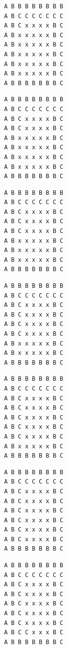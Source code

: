 { \begin{verbatim}
         A B B B B B B B B
         A B C C C C C C C
         A B C x x x x B C
         A B x x x x x B C
         A B x x x x x B C
         A B x x x x x B C
         A B x x x x x B C
         A B x x x x x B C
         A B B B B B B B C
\end{verbatim} }

{ \begin{verbatim}
         A B B B B B B B B
         A B C C C C C C C
         A B C x x x x B C
         A B C x x x x B C
         A B x x x x x B C
         A B x x x x x B C
         A B x x x x x B C
         A B x x x x x B C
         A B B B B B B B C
\end{verbatim} }

{ \begin{verbatim}
         A B B B B B B B B
         A B C C C C C C C
         A B C x x x x B C
         A B C x x x x B C
         A B C x x x x B C
         A B x x x x x B C
         A B x x x x x B C
         A B x x x x x B C
         A B B B B B B B C
\end{verbatim} }

{ \begin{verbatim}
         A B B B B B B B B
         A B C C C C C C C
         A B C x x x x B C
         A B C x x x x B C
         A B C x x x x B C
         A B C x x x x B C
         A B x x x x x B C
         A B x x x x x B C
         A B B B B B B B C
\end{verbatim} }

{ \begin{verbatim}
         A B B B B B B B B
         A B C C C C C C C
         A B C x x x x B C
         A B C x x x x B C
         A B C x x x x B C
         A B C x x x x B C
         A B C x x x x B C
         A B x x x x x B C
         A B B B B B B B C
\end{verbatim} }

{ \begin{verbatim}
         A B B B B B B B B
         A B C C C C C C C
         A B C x x x x B C
         A B C x x x x B C
         A B C x x x x B C
         A B C x x x x B C
         A B C x x x x B C
         A B C x x x x B C
         A B B B B B B B C
\end{verbatim} }

{ \begin{verbatim}
         A B B B B B B B B
         A B C C C C C C C
         A B C x x x x B C
         A B C x x x x B C
         A B C x x x x B C
         A B C x x x x B C
         A B C x x x x B C
         A B C C x x x B C
         A B B B B B B B C
\end{verbatim} }

